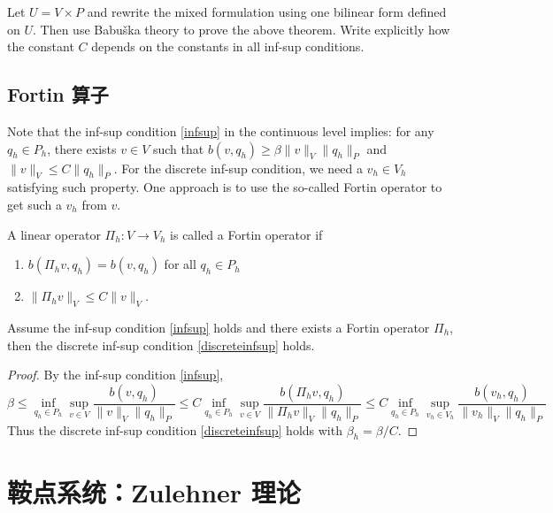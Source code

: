 \begin{exe}
Let $U = V\times P$ and rewrite the mixed formulation using one bilinear form
defined on $U$. Then use Babu\v{s}ka theory to prove the above theorem. Write explicitly how
the constant $C$ depends on the constants in all inf-sup conditions.
\end{exe}


\subsection{Fortin 算子}
Note that the inf-sup condition \eqref{infsup} in the continuous level implies:
for any $q_h\in P_h$, there exists $v \in V$ such that $b(v, q_h)\geq\beta\|v\|_V\|q_h\|_P$ and $\|v\|_V\leq C\|q_h\|_P$.
For the discrete inf-sup condition, we need a $v_h\in V_h$ satisfying such property. One
approach is to use the so-called Fortin operator \cite{Fortin1977} to get such a $v_h$ from $v$.

\begin{defn}
A linear operator $\Pi_h: V\to V_h$ is called a Fortin operator
if
\begin{enumerate}
\item $b(\Pi_hv, q_h) = b(v, q_h)$ for all $q_h\in P_h$
\item $\|\Pi_hv\|_V\leq C\|v\|_V$.
\end{enumerate}
\end{defn}

\begin{theorem}
Assume the inf-sup condition \eqref{infsup} holds and there exists a Fortin operator
$\Pi_h$, then the discrete inf-sup condition \eqref{discreteinfsup} holds.
\end{theorem}
\begin{proof}
By the inf-sup condition \eqref{infsup},
\[
\beta\leq \inf_{q_h\in P_h}\sup_{v\in V}\frac{b(v, q_h)}{\|v\|_V\|q_h\|_P}\leq C\inf_{q_h\in P_h}\sup_{v\in V}\frac{b(\Pi_hv, q_h)}{\|\Pi_hv\|_V\|q_h\|_P}\leq C\inf_{q_h\in P_h}\sup_{v_h\in V_h}\frac{b(v_h, q_h)}{\|v_h\|_V\|q_h\|_P}
\]
Thus the discrete inf-sup condition \eqref{discreteinfsup} holds with $\beta_h=\beta/C$.
\end{proof}


\section{鞍点系统：Zulehner 理论}

